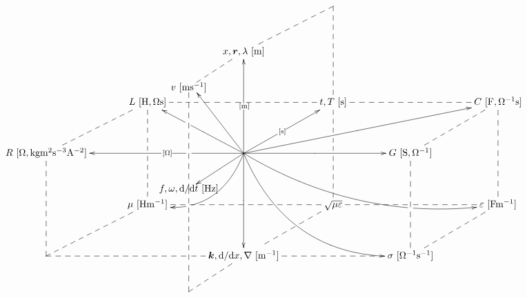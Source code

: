 \documentclass[a4j,10pt]{jarticle}
\makeatletter
\def\uni#1{[\!\unit{#1}]}
\def\cell#1#2{#1\,\uni{#2}}
\def\dotted#1{\ar@{--}[#1]}
\newcommand{\bmr}{\bm r}
\makeatother
\begin{document}
\begin{center}
\def\cell#1#2{#1\,\unit{[#2]}}
\def\uni#1{}
\vspace{-10mm}
\def\tom{\ar@{->}[uu]|-{\unit{[m]}}}
\def\tos{\ar@{->}[ur]|-{\unit{[s]}}}
\def\toO{\ar@{->}[ll]|!{[]+(-20,-13);[]+(-20,13)}\hole|-{\unit{[O]}}}
\def\tomm{\ar[dd]|-{\uni{m^{-1}}}}
\def\toms{\ar@{->}+(-20,-13)*{\cell{f,\omega, \dd/\dd t}{Hz}}|-{\uni{s^{-1}}}}
\def\tomO{\ar[rr]|-{\uni{O^{-1}}}}
\def\arrr{\dotted{rr}}
\def\ardd{\dotted{dd}}
\def\arddsplit{\dotted{dd}|!{[ld];[rr]}\hole|!{[ld];[rd]}\hole}
\def\aruu{\dotted{uu}}
\def\arll{\dotted{ll}}
\def\arllsplit{\dotted{ll}|!{[ld];[lu]}\hole}
\def\arllsplitp{\dotted{ll}|!{[]+(-20,-13);[]+(-20,13)}\hole}
\def\arrrsplit{\dotted{rr}|!{[rd];[ru]+(-20,-13)}\hole|!{[rd];[ru]}\hole}
\def\ard{\dotted{d}}
\def\arur{\dotted{ur}}
\def\ardr{\dotted{dr}}
\def\ardl{\dotted{dl} |!{+(-8,-30);+(-8,30)}\hole}
\def\arrowzp{\ar@/^2pc/[dl]|-(0.4){\uni{Hm^{-1}}}|!{[]+(-20,-13);[]+(-20,13)}\hole}
\def\arrowzzp{\ar@/_2pc/[rrrd]|-(0.25){\uni{Fm^{-1}}}|!{[rr];[rrdd]}\hole }
\def\tolv{\ar@{--}'+(-20,-13)*{\cell{v}{m s^{-1}}}'[dd]+(-20,-13)}
\def\tov{\ar@{->}[uu]+(-20,-13)+(3,-2)}
\def\toL{\ar@{->}[ul]|-{\uni{H,Os}}|!{+(-12,-12);+(-12,12)}\hole}
\def\toC{\ar@{->}[urrr]|-{\uni{F,O^{-1}s}}}
\def\arrowyyp{\ar@/_3pc/@{->}[rrdd]|-(0.7){\uni{O^{-1}m^{-1}}}}
\def\tof{\ar@{--}'+(-20,-13)'[uu]+(-20,-13) |!{+(-10,-8);+(10,-8)}\hole}
\def\toT{\ar@{--}'[ur]'[dr]}
\[\xymatrix@=0.50in{
  &&*=0{}& *=0{} &\\
  & & \cell{x,\bmr, \lambda}{m} \tolv \toT & & & & \\
  & \cell{L}{H,Os} \arrrsplit\arddsplit & & \cell{t,T}{s}\arrr\arddsplit & & \cell{C}{F,O^{-1}s} \ardd & \\
  \cell{R}{O,kg m^2 s^{-3} A^{-2}}\ardd\arur & & *=0{}\arrowyyp\toL\toC\tov\tom\tos\toO\tomO\tomm\toms \arrowzzp \arrowzp & & \cell{G}{S,\Omega^{-1}}\arur\ardd & & \\
  & \cell{\mu}{Hm^{-1}} & & \sqrt{\mu\varepsilon}\ardl\arll & & \cell{\varepsilon}{Fm^{-1}} \arllsplit & \\
  *=0{} \arur & & \cell{\bm k,\dd/\dd x, \nabla}{m^{-1}} \arllsplitp\tof & & \cell{\sigma}{O^{-1}s^{-1}}\arll\arur & & \\
}\]
\end{center}
\end{document}
